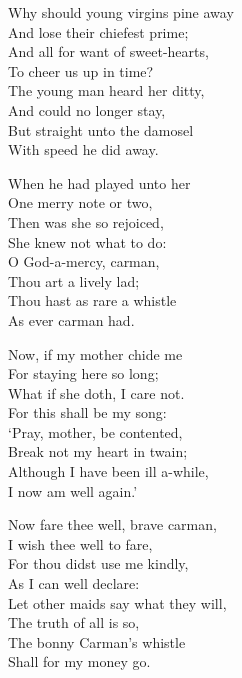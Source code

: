 \begin{dcverse}\begin{altverse}
Why should young virgins pine away\\
And lose their chiefest prime;\\
And all for want of sweet-hearts,\\
To cheer us up in time?\\
The young man heard her ditty,\\
And could no longer stay,\\
But straight unto the damosel\\
With speed he did away.
\end{altverse}

\begin{altverse}
When he had played unto her\\
One merry note or two,\\
Then was she so rejoiced,\\
She knew not what to do:\\
O God-a-mercy, carman,\\
Thou art a lively lad;\\
Thou hast as rare a whistle\\
As ever carman had.
\end{altverse}

\begin{altverse}
Now, if my mother chide me\\
For staying here so long;\\
What if she doth, I care not.\\
For this shall be my song:\\
‘Pray, mother, be contented,\\
Break not my heart in twain;\\
Although I have been ill a-while,\\
I now am well again.’
\end{altverse}

\begin{altverse}
Now fare thee well, brave carman,\\
I wish thee well to fare,\\
For thou didst use me kindly,\\
As I can well declare:\\
Let other maids say what they will,\\
The truth of all is so,\\
The bonny Carman’s whistle\\
Shall for my money go.
\end{altverse}
\end{dcverse}


